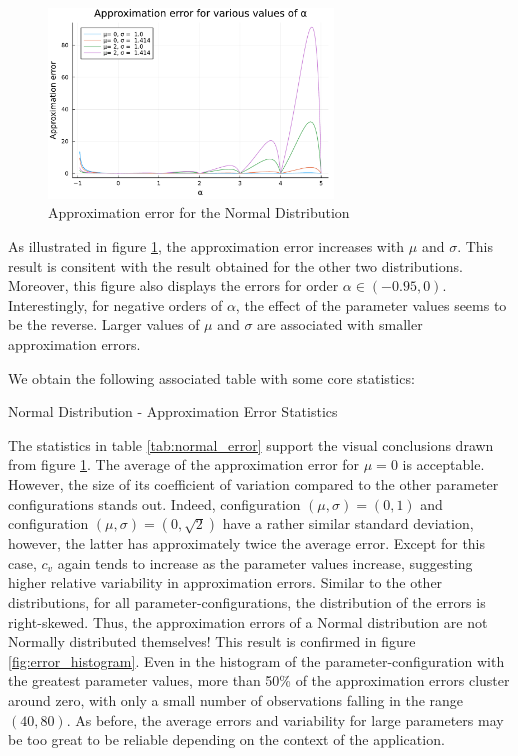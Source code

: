\begin{figure}[H]
    \centering
    \includegraphics[width=0.675\textwidth]{figures/error_plot_normal.pdf}
    \caption{Approximation error for the Normal Distribution}
    \label{fig:normal_plot_error}
\end{figure}
As illustrated in figure \ref{fig:normal_plot_error}, the approximation error increases with \(\mu\) and \(\sigma\). This result is consitent with the result obtained for the other two distributions. Moreover, this figure also displays the errors for order \(\alpha \in (-0.95, 0)\). Interestingly, for negative orders of \(\alpha\), the effect of the parameter values seems to be the reverse. Larger values of \(\mu\) and \(\sigma\) are associated with smaller approximation errors.
\newline 

We obtain the following associated table with some core statistics:
\begin{table}[H]
    \centering

\caption{Normal Distribution - Approximation Error Statistics} 
\label{tab:normal_error}
\end{table}
The statistics in table \ref{tab:normal_error} support the visual conclusions drawn from figure \ref{fig:normal_plot_error}. The average of the approximation error for \(\mu = 0\) is acceptable. However, the size of its coefficient of variation compared to the other parameter configurations stands out. Indeed, configuration \((\mu, \sigma) = (0, 1)\) and configuration \((\mu, \sigma) = (0, \sqrt{2})\) have a rather similar standard deviation, however, the latter has approximately twice the average error. Except for this case, \(c_v\) again tends to increase as the parameter values increase, suggesting higher relative variability in approximation errors. Similar to the other distributions, for all parameter-configurations, the distribution of the errors is right-skewed. Thus, the approximation errors of a Normal distribution are not Normally distributed themselves! This result is confirmed in figure \ref{fig:error_histogram}. Even in the histogram of the parameter-configuration with the greatest parameter values, more than 50\% of the approximation errors cluster around zero, with only a small number of observations falling in the range \((40, 80)\). As before, the average errors and variability for large parameters may be too great to be reliable depending on the context of the application.

